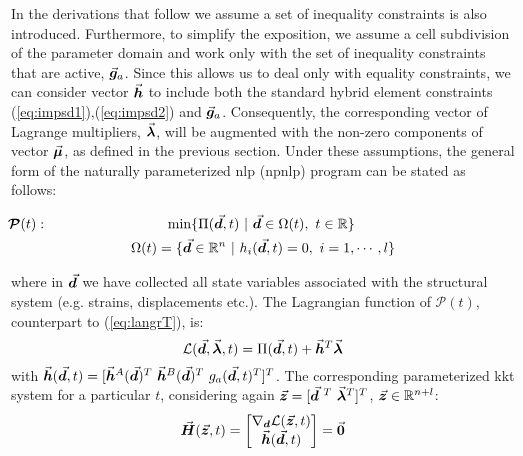 In the 
derivations that follow we assume a set of inequality constraints is also 
introduced. Furthermore, to simplify the exposition, we assume a cell 
subdivision of the parameter domain and work only with the set of inequality 
constraints that are active, $\vec{\bm{g}}_a$. Since this allows us to deal only 
with equality constraints, we can consider vector $\vec{\bm{h}}$ to include both 
the standard hybrid element constraints (\ref{eq:impsd1}),(\ref{eq:impsd2}) and 
$\vec{\bm{g}}_a$. Consequently, the corresponding vector of Lagrange multipliers, 
$\vec{\bm{\lambda}}$, will be augmented with the non-zero components of vector 
$\vec{\bm{\mu}}$, as defined in the previous section. Under these assumptions, the 
general form of the naturally parameterized \acrshort{nlp} (\acrshort{npnlp}) 
program can be stated as follows:

\begin{subequations}
	\begin{gather}
		\hspace*{-4.1cm}\bm{\mathcal{P}}(t): \hspace*{3.0cm}
		\text{min}\{\Pi(\bvec{d},t) \ |\
		\bvec{d}\in\Omega(t),\ t\in\mathbb{R}\}
		\label{eq:TPENP}\\
		\Omega(t)=\{\bvec{d}\in\mathbb{R}^n\ |\ h_i(\bvec{d},t)=0,\ 
		i=1,\cdots,l\}
		\label{eq:NPNLPDOM}
	\end{gather}
	\label{eq:NPNLP}
\end{subequations}

\noindent where in $\vec{\bm{d}}$ we have collected all state variables associated 
with the structural system (e.g. strains, displacements etc.). The Lagrangian 
function of $\bm{\mathcal{P}}(t)$, counterpart to (\ref{eq:langrT}), is:
\begin{equation}
	\mathcal{L}(\vec{\bm{d}},\vec{\bm{\lambda}},t)=\Pi(\vec{\bm{d}},t)+\vec{\bm{h}}^T\vec{\bm{\lambda}}
	\label{eq:NPNLPLang}
\end{equation}
\noindent with $\bvec{h}(\bvec{d},t)=[\bvec{h}^A(\bvec{d})^T\ 
\bvec{h}^B(\bvec{d})^T\ g_a(\bvec{d},t)^T]^T$. The corresponding 
parameterized \acrshort{kkt} system for a particular $t$, considering again 
$\bvec{z}=[\bvec{d}^{\ T}\ \bvec{\lambda}^T]^T$, $\vec{\bm{z}}\in\mathbb{R}^{n+l}$:
\begin{equation}
	\vec{\bm{H}}(\vec{\bm{z}},t) = \begin{bmatrix}
		\nabla_{\bm{d}}\mathcal{L}(\vec{\bm{z}},t)\\
		\vec{\bm{h}}(\vec{\bm{d}},t)
	\end{bmatrix}=\vec{\bm{0}}
	\label{eq:NPNLPKKT}
\end{equation}

